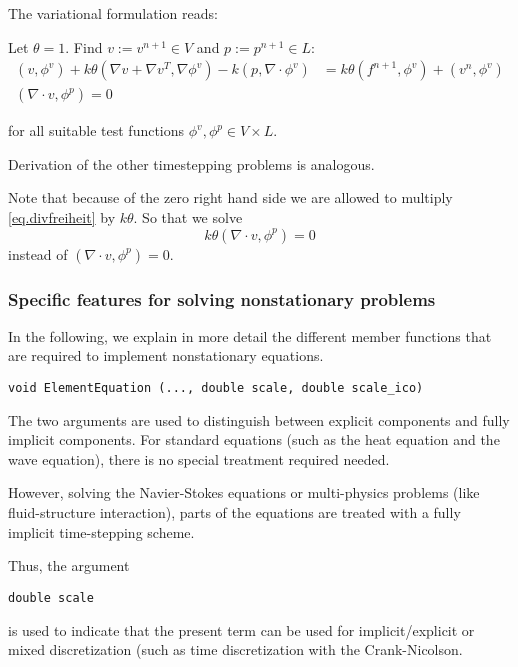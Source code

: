 The variational formulation reads:

\begin{Problem}
Let $\theta =1$. Find $v:= v^{n+1}\in V$ and $p:= p^{n+1}\in L$:
\begin{align}
(v,\phi^v) + k\theta (\nabla v + \nabla v^{T}, \nabla\phi^v) 
- k  (p, \nabla\cdot\phi^v) &=
k\theta (f^{n+1},\phi^v) +  (v^n,\phi^v)\\
(\nabla \cdot v,\phi^p) = 0  \label{eq.divfreiheit}
\end{align}
\end{Problem}
for all suitable test functions ${\phi^v , \phi^p} \in V\times L$. 


Derivation of the other timestepping problems is analogous.
\begin{remark}
Note that because of the zero right hand side we are allowed to multiply \eqref{eq.divfreiheit} by $k\theta$. So that we solve $$k\theta(\nabla \cdot v,\phi^p) = 0$$ instead of $(\nabla \cdot v,\phi^p) = 0$. 
\end{remark}


\subsubsection{Specific features for 
solving nonstationary problems}

In the following, we explain in more detail the 
different member functions that are required to
implement nonstationary equations.

\begin{verbatim}
void ElementEquation (..., double scale, double scale_ico)
\end{verbatim}
The two arguments 
are used to distinguish between explicit 
components and fully implicit components. 
For standard equations (such as the heat 
equation and the wave equation), there is 
no special treatment required needed. 

However, solving the Navier-Stokes equations or 
multi-physics problems (like fluid-structure
interaction), parts of the equations are treated
with a fully implicit time-stepping scheme.

Thus, the argument
\begin{verbatim}
double scale
\end{verbatim}
is used to indicate that the present term 
can be used for implicit/explicit or mixed 
discretization (such as time discretization with
the Crank-Nicolson.

